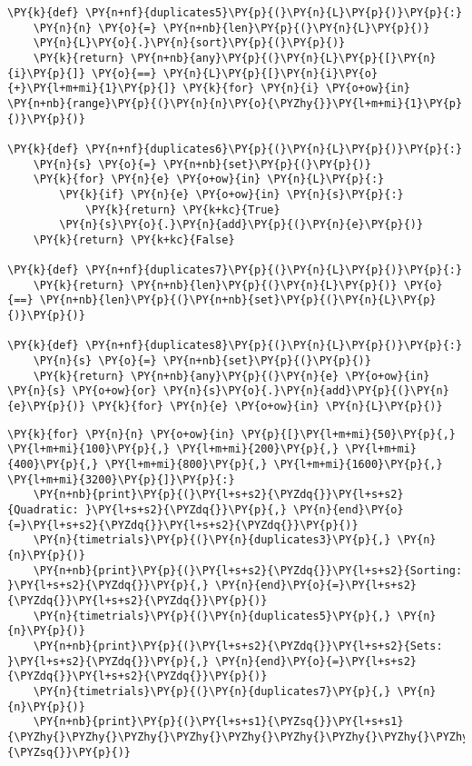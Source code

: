 \begin{Verbatim}[commandchars=\\\{\}]
\PY{k}{def} \PY{n+nf}{duplicates5}\PY{p}{(}\PY{n}{L}\PY{p}{)}\PY{p}{:}
    \PY{n}{n} \PY{o}{=} \PY{n+nb}{len}\PY{p}{(}\PY{n}{L}\PY{p}{)}
    \PY{n}{L}\PY{o}{.}\PY{n}{sort}\PY{p}{(}\PY{p}{)}
    \PY{k}{return} \PY{n+nb}{any}\PY{p}{(}\PY{n}{L}\PY{p}{[}\PY{n}{i}\PY{p}{]} \PY{o}{==} \PY{n}{L}\PY{p}{[}\PY{n}{i}\PY{o}{+}\PY{l+m+mi}{1}\PY{p}{]} \PY{k}{for} \PY{n}{i} \PY{o+ow}{in} \PY{n+nb}{range}\PY{p}{(}\PY{n}{n}\PY{o}{\PYZhy{}}\PY{l+m+mi}{1}\PY{p}{)}\PY{p}{)}

\PY{k}{def} \PY{n+nf}{duplicates6}\PY{p}{(}\PY{n}{L}\PY{p}{)}\PY{p}{:}
    \PY{n}{s} \PY{o}{=} \PY{n+nb}{set}\PY{p}{(}\PY{p}{)}
    \PY{k}{for} \PY{n}{e} \PY{o+ow}{in} \PY{n}{L}\PY{p}{:}
        \PY{k}{if} \PY{n}{e} \PY{o+ow}{in} \PY{n}{s}\PY{p}{:}
            \PY{k}{return} \PY{k+kc}{True}
        \PY{n}{s}\PY{o}{.}\PY{n}{add}\PY{p}{(}\PY{n}{e}\PY{p}{)}
    \PY{k}{return} \PY{k+kc}{False}

\PY{k}{def} \PY{n+nf}{duplicates7}\PY{p}{(}\PY{n}{L}\PY{p}{)}\PY{p}{:}
    \PY{k}{return} \PY{n+nb}{len}\PY{p}{(}\PY{n}{L}\PY{p}{)} \PY{o}{==} \PY{n+nb}{len}\PY{p}{(}\PY{n+nb}{set}\PY{p}{(}\PY{n}{L}\PY{p}{)}\PY{p}{)}

\PY{k}{def} \PY{n+nf}{duplicates8}\PY{p}{(}\PY{n}{L}\PY{p}{)}\PY{p}{:}
    \PY{n}{s} \PY{o}{=} \PY{n+nb}{set}\PY{p}{(}\PY{p}{)}
    \PY{k}{return} \PY{n+nb}{any}\PY{p}{(}\PY{n}{e} \PY{o+ow}{in} \PY{n}{s} \PY{o+ow}{or} \PY{n}{s}\PY{o}{.}\PY{n}{add}\PY{p}{(}\PY{n}{e}\PY{p}{)} \PY{k}{for} \PY{n}{e} \PY{o+ow}{in} \PY{n}{L}\PY{p}{)}
\end{Verbatim}


\begin{Verbatim}[commandchars=\\\{\}]
\PY{k}{for} \PY{n}{n} \PY{o+ow}{in} \PY{p}{[}\PY{l+m+mi}{50}\PY{p}{,} \PY{l+m+mi}{100}\PY{p}{,} \PY{l+m+mi}{200}\PY{p}{,} \PY{l+m+mi}{400}\PY{p}{,} \PY{l+m+mi}{800}\PY{p}{,} \PY{l+m+mi}{1600}\PY{p}{,} \PY{l+m+mi}{3200}\PY{p}{]}\PY{p}{:}
    \PY{n+nb}{print}\PY{p}{(}\PY{l+s+s2}{\PYZdq{}}\PY{l+s+s2}{Quadratic: }\PY{l+s+s2}{\PYZdq{}}\PY{p}{,} \PY{n}{end}\PY{o}{=}\PY{l+s+s2}{\PYZdq{}}\PY{l+s+s2}{\PYZdq{}}\PY{p}{)}
    \PY{n}{timetrials}\PY{p}{(}\PY{n}{duplicates3}\PY{p}{,} \PY{n}{n}\PY{p}{)}
    \PY{n+nb}{print}\PY{p}{(}\PY{l+s+s2}{\PYZdq{}}\PY{l+s+s2}{Sorting:   }\PY{l+s+s2}{\PYZdq{}}\PY{p}{,} \PY{n}{end}\PY{o}{=}\PY{l+s+s2}{\PYZdq{}}\PY{l+s+s2}{\PYZdq{}}\PY{p}{)}
    \PY{n}{timetrials}\PY{p}{(}\PY{n}{duplicates5}\PY{p}{,} \PY{n}{n}\PY{p}{)}
    \PY{n+nb}{print}\PY{p}{(}\PY{l+s+s2}{\PYZdq{}}\PY{l+s+s2}{Sets:      }\PY{l+s+s2}{\PYZdq{}}\PY{p}{,} \PY{n}{end}\PY{o}{=}\PY{l+s+s2}{\PYZdq{}}\PY{l+s+s2}{\PYZdq{}}\PY{p}{)}
    \PY{n}{timetrials}\PY{p}{(}\PY{n}{duplicates7}\PY{p}{,} \PY{n}{n}\PY{p}{)}
    \PY{n+nb}{print}\PY{p}{(}\PY{l+s+s1}{\PYZsq{}}\PY{l+s+s1}{\PYZhy{}\PYZhy{}\PYZhy{}\PYZhy{}\PYZhy{}\PYZhy{}\PYZhy{}\PYZhy{}\PYZhy{}\PYZhy{}\PYZhy{}\PYZhy{}\PYZhy{}\PYZhy{}\PYZhy{}\PYZhy{}\PYZhy{}\PYZhy{}\PYZhy{}\PYZhy{}\PYZhy{}\PYZhy{}\PYZhy{}\PYZhy{}\PYZhy{}\PYZhy{}\PYZhy{}}\PY{l+s+s1}{\PYZsq{}}\PY{p}{)}
\end{Verbatim}



